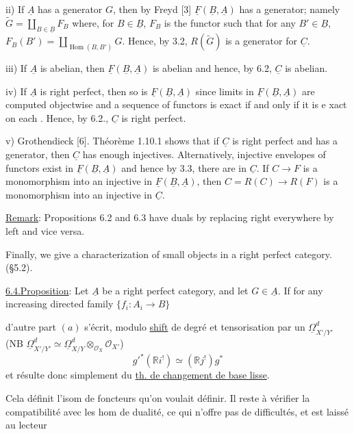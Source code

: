ii) If $\underline A$ has a generator $G$, then by Freyd [3] $\underline F(\underline B,\underline A)$ has a generator; namely $\widetilde G=\coprod_{B\in\underline B}F_B$ where, for $B\in\underline B$, $F_B$ is the functor such that for any $B'\in\underline B$, $F_B(B')=\coprod_{\operatorname{Hom}(B,B')}G$. Hence, by 3.2, $R(\widetilde G)$ is a generator for $\underline C$.

iii) If $\underline A$ is abelian, then $\underline F(\underline B,\underline A)$ is abelian and hence, by 6.2, $\underline C$ is abelian.

iv) If $\underline A$ is right perfect, then so is $\underline F(\underline B,\underline A)$ since limits in $\underline F(\underline B,\underline A)$ are computed objectwise and a sequence of functors is exact if and only if it is e xact on each . Hence, by 6.2., $\underline C$ is right perfect.

v) Grothendieck [6]. Théorème 1.10.1 shows that if $\underline C$ is right perfect and has a generator, then $\underline C$ has enough injectives. Alternatively, injective envelopes of functors exist in $\underline F(\underline B,\underline A)$ and hence by 3.3, there are  in $\underline C$. If $C\longrightarrow F$ is a monomorphism into an injective in $\underline F(\underline B,\underline A)$, then $C=R(C)\longrightarrow R(F)$ is a monomorphism into an injective in $\underline C$.

\uline{Remark}: Propositions 6.2 and 6.3 have duals by replacing right everywhere by left and vice versa.

Finally, we give a characterization of small objects in a right perfect category. (\S5.2).

\uline{6.4.}\quad\uline{Proposition}: Let $\underline A$ be a right perfect category, and let $G\in\underline A$. If for any increasing directed family $\{f_i:A_i\longrightarrow B\}$

d'autre part $(a)$ s'écrit, modulo \uline{shift} de degré et tensorisation par  un $\underline\Omega^d_{X'/Y'}$
(NB $\underline\Omega^d_{X'/Y'}\simeq\underline\Omega^d_{X/Y}\otimes_{\mathcal O_X}\mathcal O_{X'}$)
\[
g'^*(\mathbb{R}i^!)\simeq(\mathbb{R}j^!)g^*
\]
et résulte donc simplement du \uline{th. de changement de base lisse}.

Cela définit l'isom de foncteurs qu'on voulait définir. Il reste à vérifier la compatibilité avec les hom de dualité, ce qui n'offre pas de difficultés, et est laissé au lecteur \unsure{\ldots}

